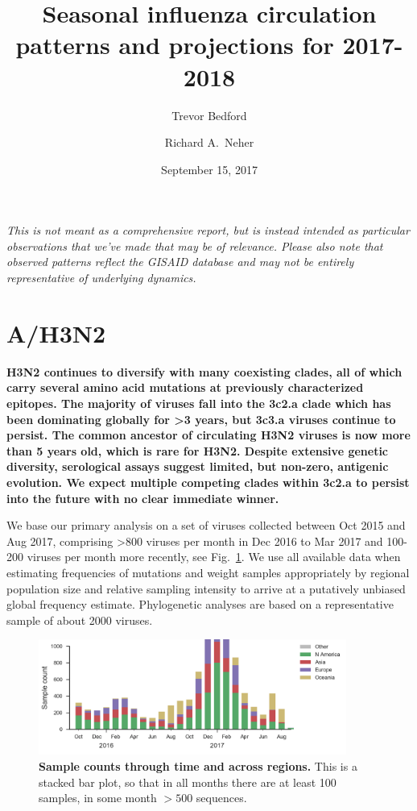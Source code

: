 \documentclass[11pt,oneside,letterpaper]{article}
\title{\vspace{2cm} \LARGE \bf
Seasonal influenza circulation patterns and projections for 2017-2018
}
\author[1]{Trevor Bedford}
\author[2]{Richard A.\ Neher}
\affil[1]{Vaccine and Infectious Disease Division, Fred Hutchinson Cancer Research Center, Seattle, WA, USA}
\affil[2]{Biozentrum, University of Basel, Basel, Switzerland}
\date{September 15, 2017}
\newcommand{\FIG}[1]{Fig.~\ref{#1}}
\begin{document}
\maketitle

\emph{This is not meant as a comprehensive report, but is instead
intended as particular observations that we've made that may be of
relevance. Please also note that observed patterns reflect the GISAID
database and may not be entirely representative of underlying dynamics.}

\tableofcontents

\pagebreak
\section*{A/H3N2}

\textbf{H3N2 continues to diversify with many coexisting clades, all of
which carry several amino acid mutations at previously characterized
epitopes. The majority of viruses fall into the 3c2.a clade which has
been dominating globally for \textgreater{}3 years, but 3c3.a viruses
continue to persist. The common ancestor of circulating H3N2 viruses is
now more than 5 years old, which is rare for H3N2. Despite extensive
genetic diversity, serological assays suggest limited, but non-zero,
antigenic evolution. We expect multiple competing clades within 3c2.a to
persist into the future with no clear immediate winner.}

We base our primary analysis on a set of viruses collected between Oct
2015 and Aug 2017, comprising \textgreater{}800 viruses per month in Dec
2016 to Mar 2017 and 100-200 viruses per month more recently, see \FIG{H3N2_counts}. We use all
available data when estimating frequencies of mutations and weight
samples appropriately by regional population size and relative sampling
intensity to arrive at a putatively unbiased global frequency estimate.
Phylogenetic analyses are based on a representative sample of about 2000
viruses.

\begin{figure}[H]
  \centering
  \includegraphics[width=0.9\textwidth]{../figures/sep-2017/h3n2_counts.png}
  \caption{\textbf{Sample counts through time and across regions.}
  This is a stacked bar plot, so that in all months there are at least 100 samples, in some month $>500$ sequences.
  }
  \label{H3N2_counts}
\end{figure}
\end{document}

